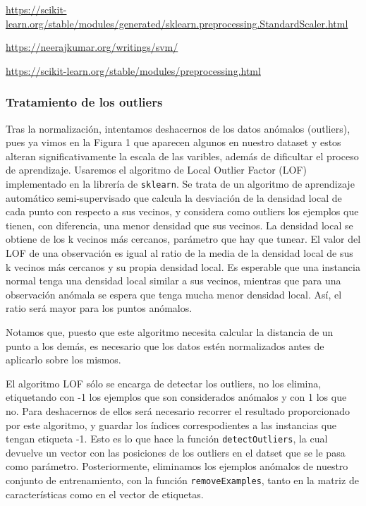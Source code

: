 \documentclass[a4]{article}
\begin{document}
\href{https://scikit-learn.org/stable/modules/generated/sklearn.preprocessing.StandardScaler.html}{https://scikit-learn.org/stable/modules/generated/sklearn.preprocessing.StandardScaler.html}

\href{https://neerajkumar.org/writings/svm/}{https://neerajkumar.org/writings/svm/}

\href{https://scikit-learn.org/stable/modules/preprocessing.html#preprocessing-scaler}{https://scikit-learn.org/stable/modules/preprocessing.html} 

\subsubsection{Tratamiento de los outliers}
Tras la normalización, intentamos deshacernos de los datos anómalos (outliers), pues ya vimos en la Figura 1 que aparecen algunos en nuestro dataset y estos alteran significativamente la escala de las varibles, además de dificultar el proceso de aprendizaje. Usaremos el algoritmo de Local Outlier Factor (LOF) implementado en la librería de \lstinline|sklearn|. Se trata de un algoritmo de aprendizaje automático semi-supervisado que calcula la desviación de la densidad local de cada punto con respecto a sus vecinos, y considera como outliers los ejemplos que tienen, con diferencia, una menor densidad que sus vecinos. La densidad local se obtiene de los k vecinos más cercanos, parámetro que hay que tunear. El valor del LOF de una observación es igual al ratio de la media de la densidad local de sus k vecinos más cercanos y su propia densidad local. Es esperable que una instancia normal tenga una densidad local similar a sus vecinos, mientras que para una observación anómala se espera que tenga mucha menor densidad local. Así, el ratio será mayor para los puntos anómalos. 

Notamos que, puesto que este algoritmo necesita calcular la distancia de un punto a los demás, es necesario que los datos estén normalizados antes de aplicarlo sobre los mismos. 

El algoritmo LOF sólo se encarga de detectar los outliers, no los elimina, etiquetando con -1 los ejemplos que son considerados anómalos y con 1 los que no. Para deshacernos de ellos será necesario recorrer el resultado proporcionado por este algoritmo, y guardar los índices correspodientes a las instancias que tengan etiqueta -1. Esto es lo que hace la función \lstinline|detectOutliers|, la cual devuelve un vector con las posiciones de los outliers en el datset que se le pasa como parámetro. Posteriormente, eliminamos los ejemplos anómalos de nuestro conjunto de entrenamiento, con la función \lstinline|removeExamples|, tanto en la matriz de características como en el vector de etiquetas. 
\end{document}
